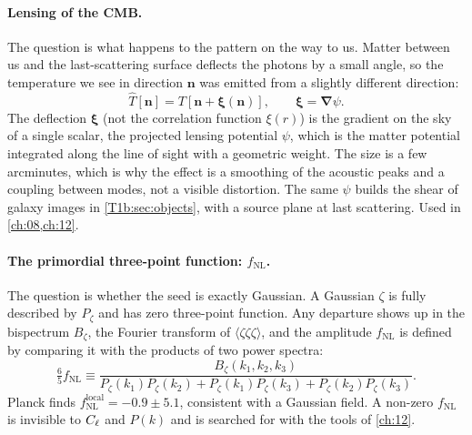 \paragraph{Lensing of the CMB.}
The question is what happens to the pattern on the way to us. Matter between us and the last-scattering surface deflects the photons by a small angle, so the temperature we see in direction $\bm n$ was emitted from a slightly different direction:
\begin{equation*}
\hat T[\bm n]=T[\bm n+\bm\xi(\bm n)],
\qquad
\bm\xi=\bm\nabla\psi .
\end{equation*}
The deflection $\bm\xi$ (not the correlation function $\xi(r)$) is the gradient on the sky of a single scalar, the projected lensing potential $\psi$, which is the matter potential integrated along the line of sight with a geometric weight. The size is a few arcminutes, which is why the effect is a smoothing of the acoustic peaks and a coupling between modes, not a visible distortion. The same $\psi$ builds the shear of galaxy images in \cref{T1b:sec:objects}, with a source plane at last scattering. Used in \cref{ch:08,ch:12}.

\paragraph{The primordial three-point function: $f_{\mathrm{NL}}$.}
The question is whether the seed is exactly Gaussian. A Gaussian $\zeta$ is fully described by $P_\zeta$ and has zero three-point function. Any departure shows up in the bispectrum $B_\zeta$, the Fourier transform of $\langle\zeta\zeta\zeta\rangle$, and the amplitude $f_{\mathrm{NL}}$ is defined by comparing it with the products of two power spectra:
\begin{equation*}
\tfrac65f_{\mathrm{NL}}\equiv\frac{B_\zeta(k_1,k_2,k_3)}{P_\zeta(k_1)P_\zeta(k_2)+P_\zeta(k_1)P_\zeta(k_3)+P_\zeta(k_2)P_\zeta(k_3)} .
\end{equation*}
Planck finds $f_{\mathrm{NL}}^{\mathrm{local}}=-0.9\pm5.1$, consistent with a Gaussian field. A non-zero $f_{\mathrm{NL}}$ is invisible to $C_\ell$ and $P(k)$ and is searched for with the tools of \cref{ch:12}.

